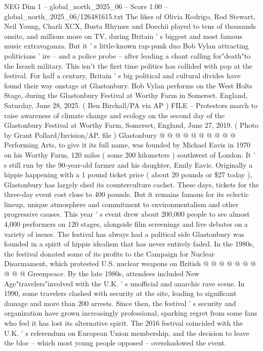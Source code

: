 \begin{textsample}{NEG Dim 1 – global\_north\_2025\_06 – Score 1.00 – global\_north\_2025\_06/126481615.txt}  \label{ex:f1_neg_121}
The likes of Olivia Rodrigo, Rod Stewart, Neil Young, Charli XCX, Busta Rhymes and Doechii played to tens of thousands onsite, and millions more on TV, during Britain ' s biggest and most famous music extravaganza.
But it ' s little-known rap-punk duo Bob Vylan attracting politicians ' ire -- and a police probe -- after leading a chant calling for"death"to the Israeli military.
This isn't the first time politics has collided with pop at the festival.
For half a century, Britain ' s big political and cultural divides have found their way onstage at Glastonbury.
Bob Vylan performs on the West Holts Stage, during the Glastonbury Festival at Worthy Farm in Somerset.
England, Saturday, June 28, 2025. ( Ben Birchall/PA via AP ) FILE -- Protestors march to raise awareness of climate change and ecology on the second day of the Glastonbury Festival at Worthy Farm, Somerset, England, June 27, 2019. ( Photo by Grant Pollard/Invision/AP, file ) Glastonbury @ @ @ @ @ @ @ @ @ @ Performing Arts, to give it its full name, was founded by Michael Eavis in 1970 on his Worthy Farm, 120 miles ( some 200 kilometers ) southwest of London.
It ' s still run by the 90-year-old farmer and his daughter, Emily Eavis.
Originally a hippie happening with a 1 pound ticket price ( about 20 pounds or \$27 today ), Glastonbury has largely shed its counterculture cachet.
These days, tickets for the three-day event cost close to 400 pounds.
But it remains famous for its eclectic lineup, unique atmosphere and commitment to environmentalism and other progressive causes.
This year ' s event drew about 200,000 people to see almost 4,000 performers on 120 stages, alongside film screenings and live debates on a variety of issues.
The festival has always had a political side Glastonbury was founded in a spirit of hippie idealism that has never entirely faded.
In the 1980s, the festival donated some of its profits to the Campaign for Nuclear Disarmament, which protested U.S. nuclear weapons on British @ @ @ @ @ @ @ @ @ @ Greenpeace.
By the late 1980s, attendees included New Age"travelers"involved with the U.K. ' s unofficial and anarchic rave scene.
In 1990, some travelers clashed with security at the site, leading to significant damage and more than 200 arrests.
Since then, the festival ' s security and organization have grown increasingly professional, sparking regret from some fans who feel it has lost its alternative spirit.
The 2016 festival coincided with the U.K. ' s referendum on European Union membership, and the decision to leave the bloc -- which most young people opposed -- overshadowed the event.

\end{textsample}
